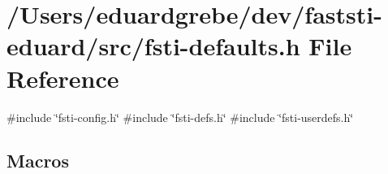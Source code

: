 \hypertarget{fsti-defaults_8h}{}\section{/\+Users/eduardgrebe/dev/faststi-\/eduard/src/fsti-\/defaults.h File Reference}
\label{fsti-defaults_8h}
{\ttfamily \#include \char`\"{}fsti-\/config.\+h\char`\"{}}\newline
{\ttfamily \#include \char`\"{}fsti-\/defs.\+h\char`\"{}}\newline
{\ttfamily \#include \char`\"{}fsti-\/userdefs.\+h\char`\"{}}\newline
\subsection*{Macros}
